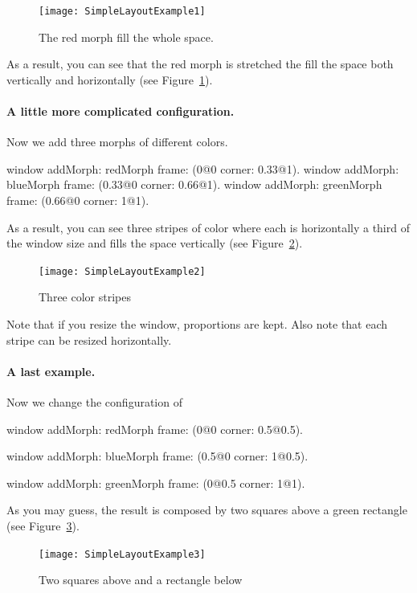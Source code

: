 \documentclass[a4paper,10pt,twoside]{book}
\begin{document}
\begin{figure}[ht]\centering
	\texttt{[image: SimpleLayoutExample1]}
	\caption{The red morph fill the whole space.}
	\label{fig:simpleLayoutExample1}
\end{figure}

As a result, you can see that the red morph is stretched the fill the space both vertically and horizontally (see Figure~\ref{fig:simpleLayoutExample1}).


\paragraph{A little more complicated configuration.}
Now we add three morphs of different colors. 

\begin{code}{}
window
	addMorph: redMorph
	frame: (0@0 corner: 0.33@1).
window
	addMorph: blueMorph
	frame: (0.33@0 corner: 0.66@1).
window
	addMorph: greenMorph
	frame: (0.66@0 corner: 1@1).
\end{code}

As a result, you can see three stripes of color where each is horizontally a third of the window size and fills the space vertically (see Figure~\ref{fig:simpleLayoutExample2}).

\begin{figure}[ht]\centering
	\texttt{[image: SimpleLayoutExample2]}
	\caption{Three color stripes}
	\label{fig:simpleLayoutExample2}
\end{figure}

Note that if you resize the window, proportions are kept. Also note that each stripe can be resized horizontally.

\paragraph{A last example.}
Now we change the configuration of 
\begin{code}{}
window
	addMorph: redMorph
	frame: (0@0 corner: 0.5@0.5).

window
	addMorph: blueMorph
	frame: (0.5@0 corner: 1@0.5).

window
	addMorph: greenMorph
	frame: (0@0.5 corner: 1@1).
\end{code}

As you may guess, the result is composed by two squares above a green rectangle (see Figure~\ref{fig:simpleLayoutExample3}).

\begin{figure}[ht]\centering
	\texttt{[image: SimpleLayoutExample3]}
	\caption{Two squares above and a rectangle below}
	\label{fig:simpleLayoutExample3}
\end{figure}
\end{document}
